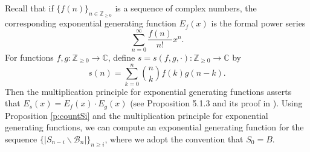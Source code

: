 \documentclass[12pt]{amsart}
\numberwithin{equation}{section}
\theoremstyle{remark}
\theoremstyle{definition}
\newcommand{\C}{\mbox{${\mathbb C}$}}
\newcommand{\B}{\mathcal{B}}
\begin{document}
  Recall that if $\{ f(n) \}_{n\in \mathbb{Z}_{\ge 0}}$ is a sequence of complex numbers, the corresponding exponential generating function $E_f(x)$ is the formal power series 
  $$\sum_{n=0}^{\infty} \frac{f(n) }{n!} x^n.$$  
 For functions $f, g:{\mathbb{Z}}_{\ge 0} \to \C$, define $s=s(f,g, \cdot):{\mathbb{Z}}_{\ge 0} \to \C$ by 
 $$s(n)=\sum_{k=0}^{n}{n\choose k} f(k)g(n-k).$$ 
 Then the multiplication principle for exponential generating functions asserts that $E_s(x)=E_f(x)\cdot E_g(x)$ (see Proposition 5.1.3 and its proof in \cite{Stanley99}).  Using Proposition \ref{p:countSi} and the multiplication principle for exponential generating functions, we can compute an exponential generating function for the sequence $\{|S_{n-i}\backslash \B_{n}|\}_{n\geq i}$, where we adopt the convention that $S_{0}=B$.    
  
  
\end{document}
